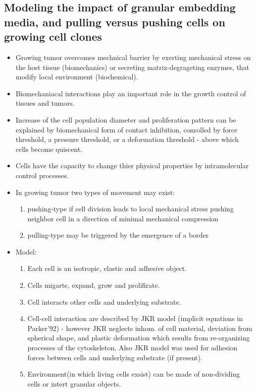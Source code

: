 \documentclass[10pt,a4paper]{article}
\begin{document}
\subsection{Modeling the impact of granular embedding media, and pulling versus pushing cells on growing cell clones \cite{dd:12}}
\begin{itemize}
 \item Growing tumor overcomes mechnical barrier by exerting mechanical stress on the host tissue (biomechanics) or secreting matrix-degrageting enzymes, that modify local environment (biochemical).
 \item Biomechaniacal interactions play an important role in the growth control of tissues and tumors. 
 \item Increase of the cell population diameter and proliferation pattern can be explained by biomechanical form of contact inhibition, conrolled by force threshold,
 a pressure threshold, or a deformation threshold - above which cells become quiscent.
 \item Cells have the capacity to change thier physical properties by intramolecular control processes.
 \item In growing tumor two types of movement may exist:
 \begin{enumerate}
  \item pushing-type if cell division leads to local mechanical stress pushing neighbor cell in a direction of minimal mechanical compression
  \item pulling-type may be triggered by the emergence of a border
 \end{enumerate}
 \item Model:
 \begin{enumerate}
  \item Each cell is an isotropic, elastic and adhesive object.  
  \item Cells migarte, expand, grow and prolifirate.
  \item Cell interacts other cells and underlying substrate.
  \item Cell-cell interaction are described by JKR model (implicit equations in Parker'92) - however JKR neglects inhom. of cell material, 
  deviation from spherical shape, and plastic deformation which results from re-organizing processes of the cytoskeleton. 
  Also JKR model was used for adhesion forces between cells and underlying substrate (if present).
  \item Environment(in which living cells exsist) can be made of non-dividing cells or intert granular objects.

\end{enumerate}
\end{itemize}
\end{document}
